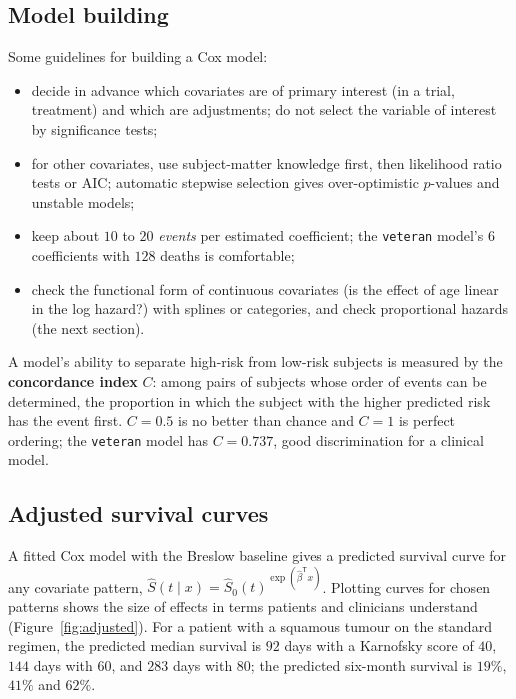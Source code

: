 \documentclass[11pt,a4paper]{article}
\numberwithin{equation}{section}
\theoremstyle{definition}
\begin{document}
\subsection{Model building}
\label{ssec:building}

Some guidelines for building a Cox model:
\begin{itemize}
\item decide in advance which covariates are of primary interest (in a trial, treatment) and which are adjustments; do not select the variable of interest by significance tests;
\item for other covariates, use subject-matter knowledge first, then likelihood ratio tests or AIC; automatic stepwise selection gives over-optimistic $p$-values and unstable models;
\item keep about $10$ to $20$ \emph{events} per estimated coefficient; the \texttt{veteran} model's $6$ coefficients with $128$ deaths is comfortable;
\item check the functional form of continuous covariates (is the effect of age linear in the log hazard?) with splines or categories, and check proportional hazards (the next section).
\end{itemize}
A model's ability to separate high-risk from low-risk subjects is measured by the \textbf{concordance index} $C$: among pairs of subjects whose order of events can be determined, the proportion in which the subject with the higher predicted risk has the event first. $C = 0.5$ is no better than chance and $C = 1$ is perfect ordering; the \texttt{veteran} model has $C = 0.737$,
good discrimination for a clinical model.

\subsection{Adjusted survival curves}
\label{ssec:adjusted}

A fitted Cox model with the Breslow baseline gives a predicted survival curve for any covariate pattern, $\hat S(t \mid x) = \hat S_0(t)^{\exp(\hat\beta^{\mathsf T}x)}$. Plotting curves for chosen patterns shows the size of effects in terms patients and clinicians understand (Figure~\ref{fig:adjusted}). For a patient with a squamous tumour on the standard regimen, the
predicted median survival is $92$ days with a Karnofsky score of $40$, $144$ days with $60$, and $283$ days with $80$; the predicted six-month survival is $19\%$, $41\%$ and $62\%$.
\end{document}
